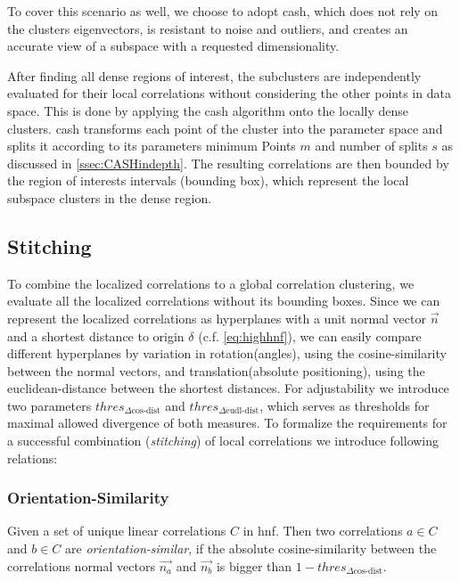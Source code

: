 To cover this scenario as well, we choose to adopt \gls{cash}, which does not rely on the clusters eigenvectors, is resistant to noise and outliers, and creates an accurate view of a subspace with a requested dimensionality.

After finding all dense regions of interest, the subclusters are independently evaluated for their local correlations without considering the other points in data space. This is done by applying the \gls{cash} algorithm onto the locally dense clusters. \gls{cash} transforms each point of the cluster into the parameter space and splits it according to its parameters minimum Points $m$ and number of splits $s$ as discussed in \autoref{ssec:CASHindepth}. The resulting correlations are then bounded by the region of interests intervals (bounding box), which represent the local subspace clusters in the dense region.

\subsection{Stitching}

To combine the localized correlations to a global correlation clustering, we evaluate all the localized correlations without its bounding boxes. Since we can represent the localized correlations as hyperplanes with a unit normal vector $\vec{n}$ and a shortest distance to origin $\delta$ (c.f. \autoref{eq:highhnf}), we can easily compare different hyperplanes by variation in rotation(angles), using the cosine-similarity between the normal vectors, and translation(absolute positioning), using the euclidean-distance between the shortest distances. For adjustability we introduce two parameters $thres_{\Delta \text{cos-dist}}$ and $thres_{\Delta \text{eudl-dist}}$, which serves as thresholds for maximal allowed divergence of both measures. To formalize the requirements for a successful combination (\textit{stitching}) of local correlations we introduce following relations:

\subsubsection*{Orientation-Similarity}
Given a set of unique linear correlations $C$ in \gls{hnf}. Then two correlations $a \in C$ and $b \in C$ are \textit{orientation-similar}, if the absolute cosine-similarity between the correlations normal vectors $\vec{n_a}$ and $\vec{n_b}$ is bigger than $1 - thres_{\Delta \text{cos-dist}}$.

